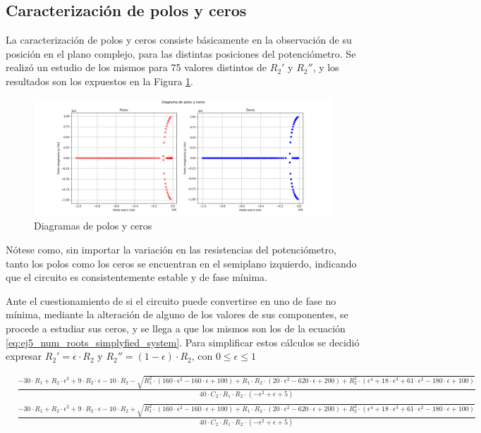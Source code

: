 \subsection{Caracterización de polos y ceros}
La caracterización de polos y ceros consiste básicamente en la observación de su posición en el plano complejo, para las distintas posiciones del potenciómetro.
Se realizó un estudio de los mismos para 75 valores distintos de $R_2'$ y $R_2''$, y los resultados son los expuestos en la Figura \ref{fig:poles_and_zeros_diag_ej5}.
\begin{figure}[H]
    \centering
    \includegraphics[width=\textwidth]{../EJ5/latex_resources/diagrama_polos_y_ceros}
    \caption{Diagramas de polos y ceros}
    \label{fig:poles_and_zeros_diag_ej5}
\end{figure}

Nótese como, sin importar la variación en las resistencias del potenciómetro, tanto los polos como los ceros se encuentran en el semiplano izquierdo, indicando que el 
circuito es consistentemente estable y de fase mínima.

Ante el cuestionamiento de si el circuito puede convertirse en uno de fase no mínima, mediante la alteración de alguno de los valores de sus componentes, se procede a 
estudiar sus ceros, y se llega a que los mismos son los de la ecuación \ref{eq:ej5_num_roots_simplyfied_system}.
Para simplificar estos cálculos se decidió expresar $R_2' = \epsilon \cdot R_2$ y $R_2'' = (1-\epsilon) \cdot R_2$, con $0 \leq \epsilon \leq 1$
\begin{ssmall}
\begin{align}
    &\frac{-30 \cdot R_1 + R_2 \cdot \epsilon^2 + 9 \cdot R_2 \cdot \epsilon - 10 \cdot R_2 - \sqrt{R_1^2 \cdot \left(160 \cdot \epsilon^2 - 160 \cdot \epsilon + 100\right) + R_1 \cdot R_2 \cdot \left(20 \cdot \epsilon^2 - 620 \cdot \epsilon + 200\right) + R_2^2 \cdot \left(\epsilon^4 + 18 \cdot \epsilon^3 + 61 \cdot \epsilon^2 - 180 \cdot \epsilon + 100\right)}}{40 \cdot C_2 \cdot R_1 \cdot R_2 \cdot (-\epsilon^2 + \epsilon + 5)} \\
    &\frac{-30 \cdot R_1 + R_2 \cdot \epsilon^2 + 9 \cdot R_2 \cdot \epsilon - 10 \cdot R_2 + \sqrt{R_1^2 \cdot \left(160 \cdot \epsilon^2 - 160 \cdot \epsilon + 100\right) + R_1 \cdot R_2 \cdot \left(20 \cdot \epsilon^2 - 620 \cdot \epsilon + 200\right) + R_2^2 \cdot \left(\epsilon^4 + 18 \cdot \epsilon^3 + 61 \cdot \epsilon^2 - 180 \cdot \epsilon + 100\right)}}{40 \cdot C_2 \cdot R_1 \cdot R_2 \cdot (-\epsilon^2 + \epsilon + 5)} 
    \label{eq:ej5_num_roots_simplyfied_system}
\end{align}
\end{ssmall}

